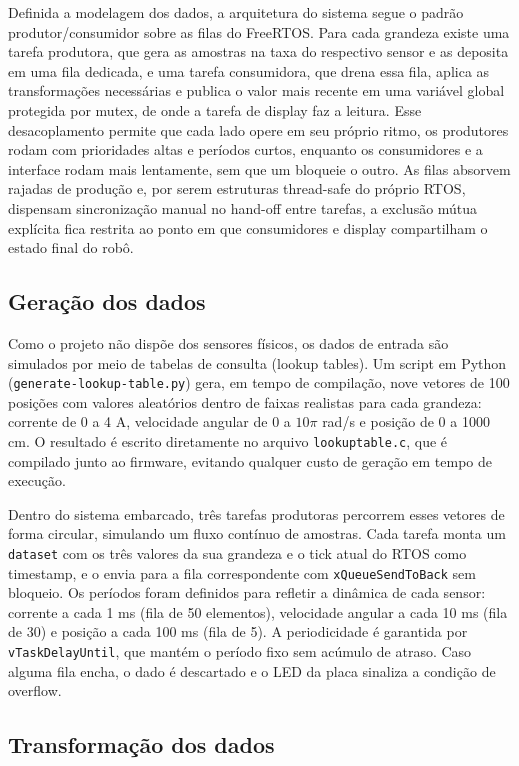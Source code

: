 \documentclass[a4paper,10pt]{article}
\begin{document}
Definida a modelagem dos dados, a arquitetura do sistema segue o padrão produtor/consumidor sobre as filas do FreeRTOS. Para cada grandeza existe uma tarefa produtora, que gera as amostras na taxa do respectivo sensor e as deposita em uma fila dedicada, e uma tarefa consumidora, que drena essa fila, aplica as transformações necessárias e publica o valor mais recente em uma variável global protegida por mutex, de onde a tarefa de display faz a leitura. Esse desacoplamento permite que cada lado opere em seu próprio ritmo, os produtores rodam com prioridades altas e períodos curtos, enquanto os consumidores e a interface rodam mais lentamente, sem que um bloqueie o outro. As filas absorvem rajadas de produção e, por serem estruturas thread-safe do próprio RTOS, dispensam sincronização manual no hand-off entre tarefas, a exclusão mútua explícita fica restrita ao ponto em que consumidores e display compartilham o estado final do robô.

\subsection{Geração dos dados}

Como o projeto não dispõe dos sensores físicos, os dados de entrada são simulados por meio de tabelas de consulta (lookup tables). Um script em Python (\texttt{generate-lookup-table.py}) gera, em tempo de compilação, nove vetores de 100 posições com valores aleatórios dentro de faixas realistas para cada grandeza: corrente de 0 a 4 A, velocidade angular de 0 a $10\pi$ rad/s e posição de 0 a 1000 cm. O resultado é escrito diretamente no arquivo \texttt{lookuptable.c}, que é compilado junto ao firmware, evitando qualquer custo de geração em tempo de execução.

Dentro do sistema embarcado, três tarefas produtoras percorrem esses vetores de forma circular, simulando um fluxo contínuo de amostras. Cada tarefa monta um \texttt{dataset} com os três valores da sua grandeza e o tick atual do RTOS como timestamp, e o envia para a fila correspondente com \texttt{xQueueSendToBack} sem bloqueio. Os períodos foram definidos para refletir a dinâmica de cada sensor: corrente a cada 1 ms (fila de 50 elementos), velocidade angular a cada 10 ms (fila de 30) e posição a cada 100 ms (fila de 5). A periodicidade é garantida por \texttt{vTaskDelayUntil}, que mantém o período fixo sem acúmulo de atraso. Caso alguma fila encha, o dado é descartado e o LED da placa sinaliza a condição de overflow.

\subsection{Transformação dos dados}
\end{document}
